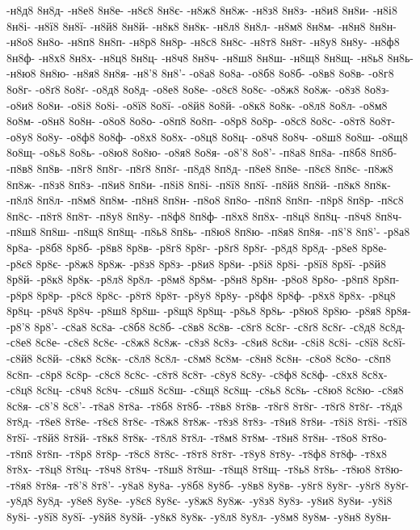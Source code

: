 {-н8д8
8н8д-
-н8е8
8н8е-
-н8є8
8н8є-
-н8ж8
8н8ж-
-н8з8
8н8з-
-н8и8
8н8и-
-н8і8
8н8і-
-н8ї8
8н8ї-
-н8й8
8н8й-
-н8к8
8н8к-
-н8л8
8н8л-
-н8м8
8н8м-
-н8н8
8н8н-
-н8о8
8н8о-
-н8п8
8н8п-
-н8р8
8н8р-
-н8с8
8н8с-
-н8т8
8н8т-
-н8у8
8н8у-
-н8ф8
8н8ф-
-н8х8
8н8х-
-н8ц8
8н8ц-
-н8ч8
8н8ч-
-н8ш8
8н8ш-
-н8щ8
8н8щ-
-н8ь8
8н8ь-
-н8ю8
8н8ю-
-н8я8
8н8я-
-н8'8
8н8'-
-о8а8
8о8а-
-о8б8
8о8б-
-о8в8
8о8в-
-о8г8
8о8г-
-о8ґ8
8о8ґ-
-о8д8
8о8д-
-о8е8
8о8е-
-о8є8
8о8є-
-о8ж8
8о8ж-
-о8з8
8о8з-
-о8и8
8о8и-
-о8і8
8о8і-
-о8ї8
8о8ї-
-о8й8
8о8й-
-о8к8
8о8к-
-о8л8
8о8л-
-о8м8
8о8м-
-о8н8
8о8н-
-о8о8
8о8о-
-о8п8
8о8п-
-о8р8
8о8р-
-о8с8
8о8с-
-о8т8
8о8т-
-о8у8
8о8у-
-о8ф8
8о8ф-
-о8х8
8о8х-
-о8ц8
8о8ц-
-о8ч8
8о8ч-
-о8ш8
8о8ш-
-о8щ8
8о8щ-
-о8ь8
8о8ь-
-о8ю8
8о8ю-
-о8я8
8о8я-
-о8'8
8о8'-
-п8а8
8п8а-
-п8б8
8п8б-
-п8в8
8п8в-
-п8г8
8п8г-
-п8ґ8
8п8ґ-
-п8д8
8п8д-
-п8е8
8п8е-
-п8є8
8п8є-
-п8ж8
8п8ж-
-п8з8
8п8з-
-п8и8
8п8и-
-п8і8
8п8і-
-п8ї8
8п8ї-
-п8й8
8п8й-
-п8к8
8п8к-
-п8л8
8п8л-
-п8м8
8п8м-
-п8н8
8п8н-
-п8о8
8п8о-
-п8п8
8п8п-
-п8р8
8п8р-
-п8с8
8п8с-
-п8т8
8п8т-
-п8у8
8п8у-
-п8ф8
8п8ф-
-п8х8
8п8х-
-п8ц8
8п8ц-
-п8ч8
8п8ч-
-п8ш8
8п8ш-
-п8щ8
8п8щ-
-п8ь8
8п8ь-
-п8ю8
8п8ю-
-п8я8
8п8я-
-п8'8
8п8'-
-р8а8
8р8а-
-р8б8
8р8б-
-р8в8
8р8в-
-р8г8
8р8г-
-р8ґ8
8р8ґ-
-р8д8
8р8д-
-р8е8
8р8е-
-р8є8
8р8є-
-р8ж8
8р8ж-
-р8з8
8р8з-
-р8и8
8р8и-
-р8і8
8р8і-
-р8ї8
8р8ї-
-р8й8
8р8й-
-р8к8
8р8к-
-р8л8
8р8л-
-р8м8
8р8м-
-р8н8
8р8н-
-р8о8
8р8о-
-р8п8
8р8п-
-р8р8
8р8р-
-р8с8
8р8с-
-р8т8
8р8т-
-р8у8
8р8у-
-р8ф8
8р8ф-
-р8х8
8р8х-
-р8ц8
8р8ц-
-р8ч8
8р8ч-
-р8ш8
8р8ш-
-р8щ8
8р8щ-
-р8ь8
8р8ь-
-р8ю8
8р8ю-
-р8я8
8р8я-
-р8'8
8р8'-
-с8а8
8с8а-
-с8б8
8с8б-
-с8в8
8с8в-
-с8г8
8с8г-
-с8ґ8
8с8ґ-
-с8д8
8с8д-
-с8е8
8с8е-
-с8є8
8с8є-
-с8ж8
8с8ж-
-с8з8
8с8з-
-с8и8
8с8и-
-с8і8
8с8і-
-с8ї8
8с8ї-
-с8й8
8с8й-
-с8к8
8с8к-
-с8л8
8с8л-
-с8м8
8с8м-
-с8н8
8с8н-
-с8о8
8с8о-
-с8п8
8с8п-
-с8р8
8с8р-
-с8с8
8с8с-
-с8т8
8с8т-
-с8у8
8с8у-
-с8ф8
8с8ф-
-с8х8
8с8х-
-с8ц8
8с8ц-
-с8ч8
8с8ч-
-с8ш8
8с8ш-
-с8щ8
8с8щ-
-с8ь8
8с8ь-
-с8ю8
8с8ю-
-с8я8
8с8я-
-с8'8
8с8'-
-т8а8
8т8а-
-т8б8
8т8б-
-т8в8
8т8в-
-т8г8
8т8г-
-т8ґ8
8т8ґ-
-т8д8
8т8д-
-т8е8
8т8е-
-т8є8
8т8є-
-т8ж8
8т8ж-
-т8з8
8т8з-
-т8и8
8т8и-
-т8і8
8т8і-
-т8ї8
8т8ї-
-т8й8
8т8й-
-т8к8
8т8к-
-т8л8
8т8л-
-т8м8
8т8м-
-т8н8
8т8н-
-т8о8
8т8о-
-т8п8
8т8п-
-т8р8
8т8р-
-т8с8
8т8с-
-т8т8
8т8т-
-т8у8
8т8у-
-т8ф8
8т8ф-
-т8х8
8т8х-
-т8ц8
8т8ц-
-т8ч8
8т8ч-
-т8ш8
8т8ш-
-т8щ8
8т8щ-
-т8ь8
8т8ь-
-т8ю8
8т8ю-
-т8я8
8т8я-
-т8'8
8т8'-
-у8а8
8у8а-
-у8б8
8у8б-
-у8в8
8у8в-
-у8г8
8у8г-
-у8ґ8
8у8ґ-
-у8д8
8у8д-
-у8е8
8у8е-
-у8є8
8у8є-
-у8ж8
8у8ж-
-у8з8
8у8з-
-у8и8
8у8и-
-у8і8
8у8і-
-у8ї8
8у8ї-
-у8й8
8у8й-
-у8к8
8у8к-
-у8л8
8у8л-
-у8м8
8у8м-
-у8н8
8у8н-
}
